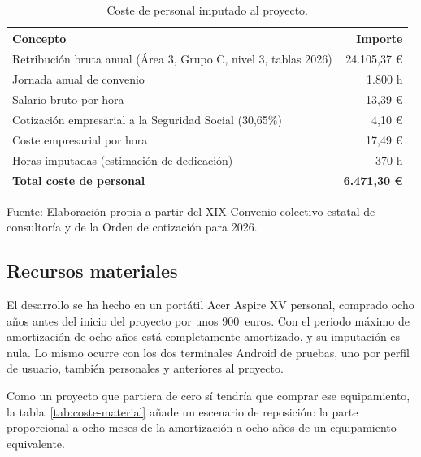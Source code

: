 \begin{table}[htbp]
    \centering
    \caption{Coste de personal imputado al proyecto.}
    \label{tab:coste-personal}
    \begin{tabularx}{\textwidth}{@{}>{\RaggedRight\arraybackslash}X r@{}}
        \toprule
        \textbf{Concepto} & \textbf{Importe} \\
        \midrule
        Retribución bruta anual (Área 3, Grupo C, nivel 3, tablas 2026) & 24.105,37 € \\
        Jornada anual de convenio                             & 1.800 h \\
        Salario bruto por hora                                & 13,39 € \\
        Cotización empresarial a la Seguridad Social (30,65\%) & 4,10 € \\
        \midrule
        Coste empresarial por hora                            & 17,49 € \\
        Horas imputadas (estimación de dedicación)            & 370 h \\
        \midrule
        \textbf{Total coste de personal}                      & \textbf{6.471,30 €} \\
        \bottomrule
    \end{tabularx}

    \vspace{2pt}
    {\footnotesize Fuente: Elaboración propia a partir del XIX Convenio colectivo estatal de consultoría y de la Orden de cotización para 2026.}
\end{table}

\subsection{Recursos materiales}

El desarrollo se ha hecho en un portátil Acer Aspire XV personal, comprado ocho años antes del inicio del proyecto por unos 900~euros. Con el periodo máximo de amortización de ocho años está completamente amortizado, y su imputación es nula. Lo mismo ocurre con los dos terminales Android de pruebas, uno por perfil de usuario, también personales y anteriores al proyecto.

Como un proyecto que partiera de cero sí tendría que comprar ese equipamiento, la tabla~\ref{tab:coste-material} añade un escenario de reposición: la parte proporcional a ocho meses de la amortización a ocho años de un equipamiento equivalente.

